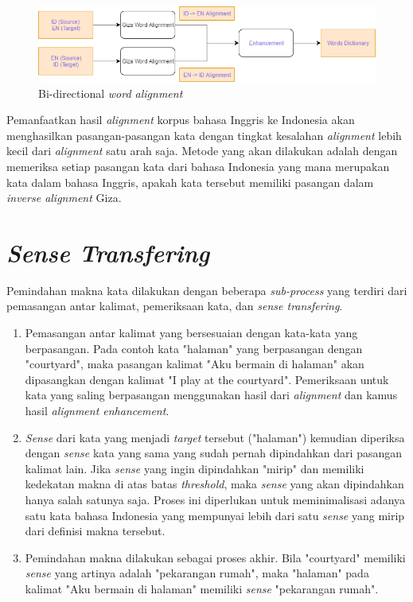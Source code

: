 \begin{figure}
	\centering
	\includegraphics[width=1\linewidth]{adit_pics/bidirectional-enhancement.png}
	\caption{Bi-directional \textit{word alignment}}
	\label{fig:Bidirectional-Enhancement}
\end{figure}


Pemanfaatkan hasil \textit{alignment} korpus bahasa Inggris ke Indonesia akan menghasilkan pasangan-pasangan kata dengan tingkat kesalahan \textit{alignment} lebih kecil dari \textit{alignment} satu arah saja. Metode yang akan dilakukan adalah dengan memeriksa setiap pasangan kata dari bahasa Indonesia yang mana merupakan kata dalam bahasa Inggris, apakah kata tersebut memiliki pasangan dalam \textit{inverse alignment} Giza.




\section{\textit{Sense Transfering}} \label{sec:Sense Transfering}
Pemindahan makna kata dilakukan dengan beberapa \textit{sub-process} yang terdiri dari pemasangan antar kalimat, pemeriksaan kata, dan \textit{sense transfering}.
\begin{enumerate}
	\item Pemasangan antar kalimat yang bersesuaian dengan kata-kata yang berpasangan. Pada contoh kata "halaman" yang berpasangan dengan "courtyard", maka pasangan kalimat "Aku bermain di halaman" akan dipasangkan dengan kalimat "I play at the courtyard". Pemeriksaan untuk kata yang saling berpasangan menggunakan hasil dari \textit{alignment} dan kamus hasil \textit{alignment enhancement}.
	\item \textit{Sense} dari kata yang menjadi \textit{target} tersebut ("halaman") kemudian diperiksa dengan \textit{sense} kata yang sama yang sudah pernah dipindahkan dari pasangan kalimat lain. Jika \textit{sense} yang ingin dipindahkan "mirip" dan memiliki kedekatan makna di atas batas \textit{threshold}, maka \textit{sense} yang akan dipindahkan hanya salah satunya saja. Proses ini diperlukan untuk meminimalisasi adanya satu kata bahasa Indonesia yang mempunyai lebih dari satu \textit{sense} yang mirip dari definisi makna tersebut.
	\item Pemindahan makna dilakukan sebagai proses akhir. Bila "courtyard" memiliki \textit{sense} yang artinya adalah "pekarangan rumah", maka "halaman" pada kalimat "Aku bermain di halaman" memiliki \textit{sense} "pekarangan rumah".
\end{enumerate}

